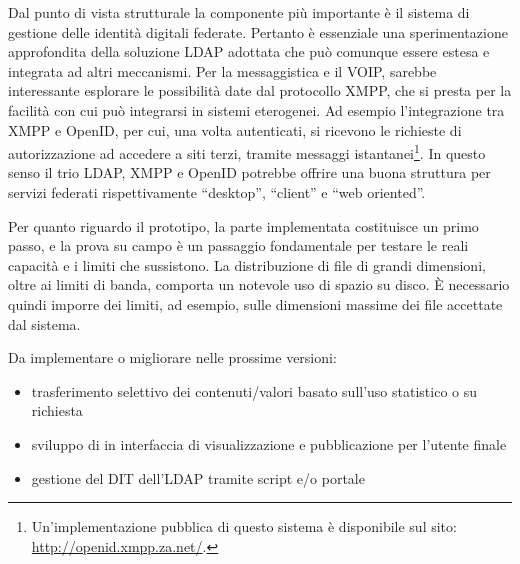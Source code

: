 Dal punto di vista strutturale la componente più importante è il
sistema di gestione delle identità digitali federate. Pertanto è
essenziale una sperimentazione approfondita della soluzione LDAP
adottata che può comunque essere estesa e integrata ad altri
meccanismi. Per la messaggistica e il VOIP, sarebbe interessante
esplorare le possibilità date dal protocollo XMPP, che si presta per
la facilità con cui può integrarsi in sistemi eterogenei. Ad esempio
l'integrazione tra XMPP e OpenID, per cui, una volta autenticati, si
ricevono le richieste di autorizzazione ad accedere a siti terzi,
tramite messaggi istantanei\footnote{Un'implementazione pubblica di
  questo sistema è disponibile sul sito:
  \url{http://openid.xmpp.za.net/}.}. In questo senso il trio LDAP,
XMPP e OpenID potrebbe offrire una buona struttura per servizi
federati rispettivamente ``desktop'', ``client'' e ``web oriented''.

Per quanto riguardo il prototipo, la parte implementata costituisce un
primo passo, e la prova su campo è un passaggio fondamentale per
testare le reali capacità e i limiti che sussistono. La distribuzione
di file di grandi dimensioni, oltre ai limiti di banda, comporta un
notevole uso di spazio su disco. È necessario quindi imporre dei
limiti, ad esempio, sulle dimensioni massime dei file accettate dal
sistema.

Da implementare o migliorare nelle prossime versioni:
\begin{itemize}
\item trasferimento selettivo dei contenuti/valori basato sull'uso
  statistico o su richiesta
\item sviluppo di in interfaccia di visualizzazione e pubblicazione
  per l'utente finale
\item gestione del DIT dell'LDAP tramite script e/o portale
\end{itemize}

